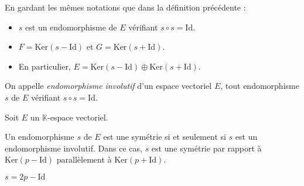 \documentclass[a4paper,10pt]{report}
\begin{document}
\begin{Proposition}{} En gardant les mêmes notations que dans la définition précédente :
\begin{itemize}
\item $s$ est un endomorphisme de $E$ vérifiant $s \circ s = \textrm{Id}$.
\item $F = \textrm{Ker}(s-\textrm{Id})$ et $G= \textrm{Ker}(s+\textrm{Id})$.
\item En particulier, $E= \textrm{Ker}(s-\textrm{Id}) \oplus \textrm{Ker}(s+\textrm{Id})$.
\end{itemize}
\end{Proposition}

\begin{Demonstration}{}
\vspace{8cm}
\newpage
\phantom{test}

\vspace{7.5cm}
\end{Demonstration}

\begin{Definition}{} On appelle \emph{endomorphisme involutif} d'un espace vectoriel $E$, tout endomorphisme $s$ de $E$ vérifiant \newline $s \circ s = \textrm{Id}$.
\end{Definition}

\begin{Proposition}{} Soit $E$ un $\mathbb{K}$-espace vectoriel.

Un endomorphisme $s$ de $E$ est une symétrie si et seulement si $s$ est un endomorphisme involutif. Dans ce cas, $s$ est une symétrie par rapport à $\textrm{Ker}(p-\textrm{Id})$ parallèlement à $\textrm{Ker}(p+\textrm{Id})$.
\end{Proposition}

\vspace{13cm}

\begin{retenir} $s=2p-\textrm{Id}$
\end{retenir}
\end{document}
